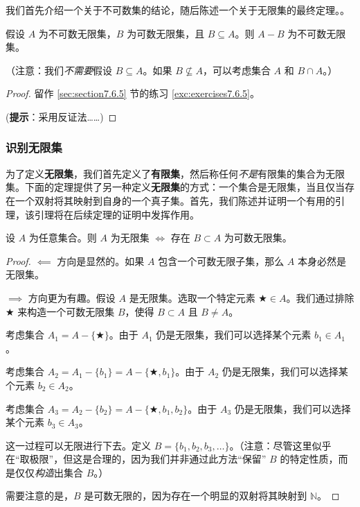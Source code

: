 我们首先介绍一个关于不可数集的结论，随后陈述一个关于无限集的最终定理。。

\begin{lemma}\label{lemma7.6.29}
    假设 $A$ 为不可数无限集，$B$ 为可数无限集，且 $B \subseteq A$。则 $A-B$ 为不可数无限集。
\end{lemma}

（注意：我们\emph{不需要}假设 $B \subseteq A$。如果 $B \not\subseteq A$，可以考虑集合 $A$ 和 $B \cap A$。）

\begin{proof}
    留作 \ref{sec:section7.6.5} 节的练习 \ref{exc:exercises7.6.5}。

    (\textbf{提示}：采用反证法……)
\end{proof}

\subsubsection*{识别无限集}

为了定义\textbf{无限集}，我们首先定义了\textbf{有限集}，然后称任何\emph{不是}有限集的集合为无限集。下面的定理提供了另一种定义\textbf{无限集}的方式：一个集合是无限集，当且仅当存在一个双射将其映射到自身的一个真子集。首先，我们陈述并证明一个有用的引理，该引理将在后续定理的证明中发挥作用。

\begin{lemma}\label{lemma7.6.30}
    设 $A$ 为任意集合。则 $A$ 为无限集 $\iff$ 存在 $B \subset A$ 为可数无限集。
\end{lemma}

\begin{proof}

    $\impliedby$ 方向是显然的。如果 $A$ 包含一个可数无限子集，那么 $A$ 本身必然是无限集。

    $\implies$ 方向更为有趣。假设 $A$ 是无限集。选取一个特定元素 $\bigstar \in A$。我们通过排除 $\bigstar$ 来构造一个可数无限集 $B$，使得 $B \subset A$ 且 $B \ne A$。

    考虑集合 $A_1 = A - \{\bigstar\}$。由于 $A_1$ 仍是无限集，我们可以选择某个元素 $b_1 \in A_1$。

    考虑集合 $A_2 = A_1 - \{b_1\} = A - \{\bigstar, b_1\}$。由于 $A_2$ 仍是无限集，我们可以选择某个元素 $b_2 \in A_2$。

    考虑集合 $A_3 = A_2 - \{b_2\} = A - \{\bigstar, b_1, b_2\}$。由于 $A_3$ 仍是无限集，我们可以选择某个元素 $b_3 \in A_3$。

    这一过程可以无限进行下去。定义 $B = \{b_1, b_2, b_3, \dots\}$。（注意：尽管这里似乎在``取极限''，但这是合理的，因为我们并非通过此方法``保留'' $B$ 的特定性质，而是仅仅\emph{构造}出集合 $B$。）

    需要注意的是，$B$ 是可数无限的，因为存在一个明显的双射将其映射到 $\mathbb{N}$。
\end{proof}

